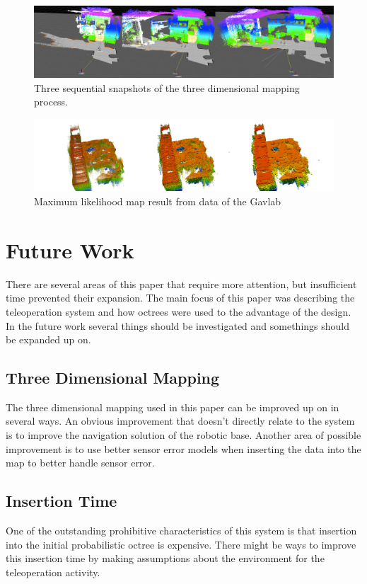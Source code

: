 \documentclass[journal]{IEEEtran}
\begin{document}
  \begin{figure}[here]
    \centering
    \includegraphics[width=7in,keepaspectratio]{mapping.pdf}
    \caption{Three sequential snapshots of the three dimensional mapping 
             process.}
    \label{fig:mapping}
  \end{figure}
  
  \begin{figure}[here]
    \centering
    \includegraphics[width=7in,keepaspectratio]{gavlab.pdf}
    \caption{Maximum likelihood map result from data of the Gavlab}
    \label{fig:octovis}
  \end{figure}
  
  \section{Future Work}
  There are several areas of this paper that require more attention, but
  insufficient time prevented their expansion. The main focus of this paper
  was describing the teleoperation system and how octrees were used to the
  advantage of the design. In the future work several things should be
  investigated and somethings should be expanded up on.
  
  \subsection{Three Dimensional Mapping}
  The three dimensional mapping used in this paper can be improved up on in
  several ways. An obvious improvement that doesn't directly relate to the
  system is to improve the navigation solution of the robotic base. Another
  area of possible improvement is to use better sensor error models when
  inserting the data into the map to better handle sensor error.
  
  \subsection{Insertion Time}
  One of the outstanding prohibitive characteristics of this system is that
  insertion into the initial probabilistic octree is expensive. There might be
  ways to improve this insertion time by making assumptions about the
  environment for the teleoperation activity.
  
\end{document}
